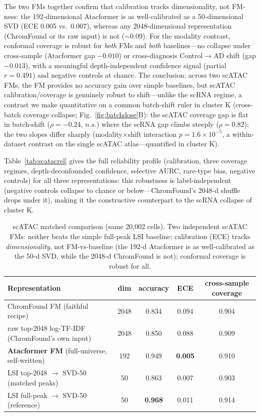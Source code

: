 \documentclass[fleqn,10pt,lineno]{wlpeerj}  %
\begin{document}
The two FMs together confirm that calibration tracks dimensionality, not FM-ness: the 192-dimensional Atacformer is as well-calibrated as a 50-dimensional SVD (ECE 0.005 vs.\ 0.007), whereas any 2048-dimensional representation (ChromFound or its raw input) is not ($\sim$0.09). For the modality contrast, conformal coverage is robust for \emph{both} FMs and \emph{both} baselines---no collapse under cross-sample (Atacformer gap $-0.010$) or cross-diagnosis Control$\to$AD shift (gap $-0.013$), with a meaningful depth-independent confidence signal (partial $r=0.491$) and negative controls at chance. The conclusion: across two scATAC FMs, the FM provides no accuracy gain over simple baselines, but scATAC calibration/coverage is genuinely robust to shift---unlike the scRNA regime, a contrast we make quantitative on a common batch-shift ruler in cluster K (cross-batch coverage collapse; Fig.~\ref{fig:batchdose}B): the scATAC coverage gap is flat in batch-shift ($\rho=-0.24$, $n.s.$) where the scRNA gap climbs steeply ($\rho=0.82$); the two slopes differ sharply (modality$\times$shift interaction $p=1.6\times10^{-5}$, a within-dataset contrast on the single scATAC atlas---quantified in cluster K).

Table~\ref{tab:scatacrel} gives the full reliability profile (calibration, three coverage regimes, depth-deconfounded confidence, selective AURC, rare-type bias, negative controls) for all three representations: this robustness is label-independent (negative controls collapse to chance or below---ChromFound's 2048-d shuffle drops under it), making it the constructive counterpart to the scRNA collapse of cluster K.

\begin{table}[!ht]\centering\footnotesize
\caption{scATAC matched comparison (same 20{,}002 cells). Two independent scATAC FMs: neither beats the simple full-peak LSI baseline; calibration (ECE) tracks \emph{dimensionality}, not FM-vs-baseline (the 192-d Atacformer is as well-calibrated as the 50-d SVD, while the 2048-d ChromFound is not); conformal coverage is robust for all.}
\label{tab:fm}
\begin{tabular}{@{}lcccc@{}}
\toprule
Representation & dim & accuracy & ECE & cross-sample coverage \\
\midrule
ChromFound FM (faithful recipe) & 2048 & 0.834 & 0.094 & 0.904 \\
raw top-2048 log-TF-IDF (ChromFound's own input) & 2048 & 0.850 & 0.088 & 0.909 \\
\textbf{Atacformer FM} (full-universe, self-written) & 192 & 0.949 & \textbf{0.005} & 0.910 \\
LSI top-2048 $\to$ SVD-50 (matched peaks) & 50 & 0.863 & 0.007 & 0.903 \\
LSI full-peak $\to$ SVD-50 (reference) & 50 & \textbf{0.968} & 0.011 & 0.914 \\
\bottomrule
\end{tabular}
\end{table}
\end{document}
